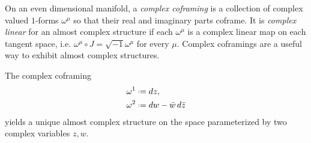 On an even dimensional manifold, a \emph{complex coframing} is a collection of complex valued \(1\)-forms \(\omega^{\mu}\) so that their real and imaginary parts coframe.
It is \emph{complex linear} for an almost complex structure if each \(\omega^{\mu}\) is a complex linear map on each tangent space, i.e. \(\omega^{\mu}\circ J = \sqrt{-1}\omega^{\mu}\) for every \(\mu\).
Complex coframings are a useful way to exhibit almost complex structures.
\begin{example}
The complex coframing
\begin{align*}
\omega^1&\defeq dz,\\
\omega^2&\defeq dw-\bar{w} \, d\bar{z}
\end{align*}
yields a unique almost complex structure on the space parameterized by two complex variables \(z,w\).
\end{example}

